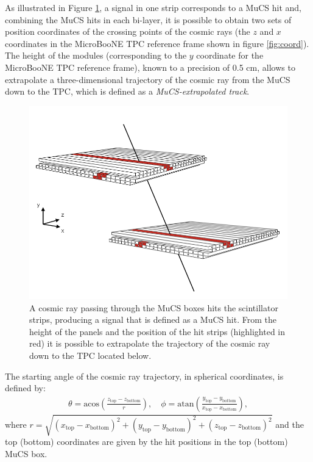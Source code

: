 \documentclass[a4paper,11pt]{article}
\begin{document}
As illustrated in Figure \ref{fig:boxes}, a signal in one strip corresponds to a MuCS hit and, combining the MuCS hits in each bi-layer, it is possible to obtain two sets of position coordinates of the crossing points of the cosmic rays (the $z$ and $x$ coordinates in the MicroBooNE TPC reference frame shown in figure \ref{fig:coord}). The height of the modules (corresponding to the $y$ coordinate for the MicroBooNE TPC reference frame), known to a precision of 0.5 cm, allows to extrapolate a three-dimensional trajectory of the cosmic ray from the MuCS down to the TPC, which is defined as a \emph{MuCS-extrapolated track}.
\begin{figure}[htbp]
  \begin{center}
    \includegraphics[width=0.7\linewidth]{figures/boxes.png}
    \caption{A cosmic ray passing through the MuCS boxes hits the scintillator strips, producing a signal that is defined as a MuCS hit. From the height of the panels and the position of the hit strips (highlighted in red) it is possible to extrapolate the trajectory of the cosmic ray down to the TPC located below.} \label{fig:boxes}
  \end{center}
\end{figure}

The starting angle of the cosmic ray trajectory, in spherical coordinates, is defined by:
\begin{align}\label{eq:angles}
  \theta = \mathrm{acos}\left(\frac{z_{\mathrm{top}}-z_{\mathrm{bottom}}}{r}\right), \quad
  \phi = \mathrm{atan}\left(\frac{y_{\mathrm{top}}-y_{\mathrm{bottom}}}{x_{\mathrm{top}}-x_{\mathrm{bottom}}}\right),
\end{align}
where $r = \sqrt{(x_{\mathrm{top}}-x_{\mathrm{bottom}})^2+(y_{\mathrm{top}}-y_{\mathrm{bottom}})^2+(z_{\mathrm{top}}-z_{\mathrm{bottom}})^2}$ and the top (bottom) coordinates are given by the hit positions in the top (bottom) MuCS box.
\end{document}
